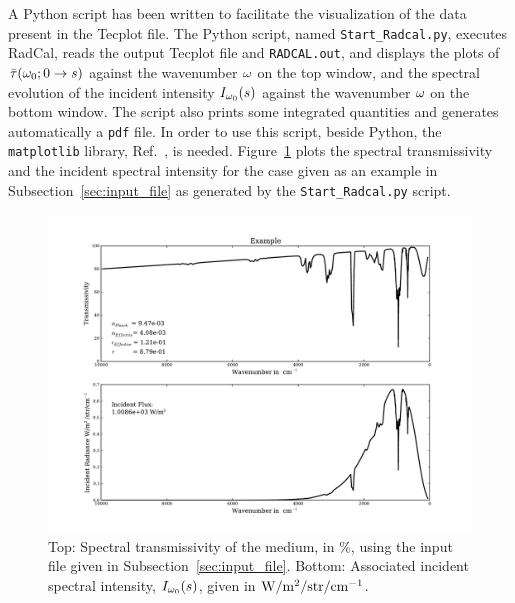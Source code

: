 A Python script has been written to facilitate the visualization of the data present in the Tecplot file. The Python script, named \verb=Start_Radcal.py=, executes RadCal, reads the output Tecplot file and \verb=RADCAL.out=, and displays the plots of $\bar{\tau}(\omega_0; 0 \rightarrow s) $ against the wavenumber $\omega$ on the top window, and the spectral evolution of the incident intensity $I_{\omega_0}(s)$ against the wavenumber $\omega$ on the bottom window. The script also prints some integrated quantities and generates automatically a \verb=pdf= file. In order to use this script, beside Python, the \verb=matplotlib= library, Ref.~\cite{Hunter:2007}, is needed. Figure~\ref{fig:EXAMPLE} plots the spectral transmissivity and the incident spectral intensity for the case given as an example in Subsection~\ref{sec:input_file} as generated by the \verb=Start_Radcal.py= script.

\begin{figure}
\includegraphics[width=\textwidth]{Figures/Example.pdf}
\caption{Top: Spectral transmissivity of the medium, in \%, using the input file given in Subsection~\ref{sec:input_file}. Bottom: Associated incident spectral intensity, $I_{\omega_0}(s)$, given in $\rm W/m^{2}/str/cm^{-1}$.\label{fig:EXAMPLE}}
\end{figure}

